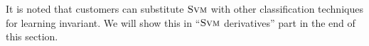 It is noted that customers can substitute $\textsc{Svm}$ with other classification techniques for learning invariant. 
We will show this in ``$\textsc{Svm}$ derivatives'' part in the end of this section.
 



